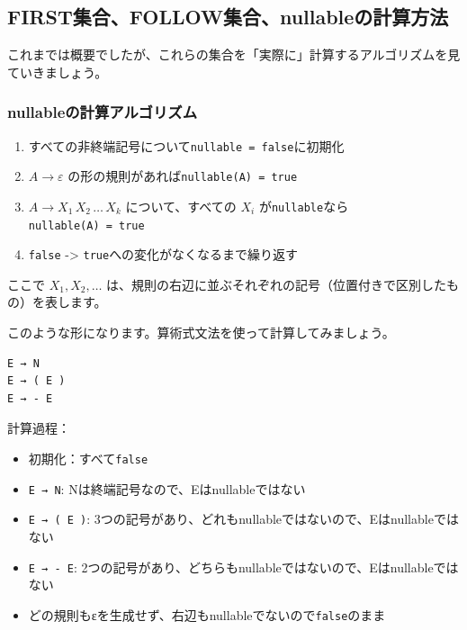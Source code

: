 \hypertarget{chapter5-firstux96c6ux5408followux96c6ux5408nullableux306eux8a08ux7b97ux65b9ux6cd5}{%
\subsection{FIRST集合、FOLLOW集合、nullableの計算方法}\label{chapter5-firstux96c6ux5408followux96c6ux5408nullableux306eux8a08ux7b97ux65b9ux6cd5}}

これまでは概要でしたが、これらの集合を「実際に」計算するアルゴリズムを見ていきましょう。

\hypertarget{chapter5-nullableux306eux8a08ux7b97ux30a2ux30ebux30b4ux30eaux30baux30e0}{%
\subsubsection{nullableの計算アルゴリズム}\label{chapter5-nullableux306eux8a08ux7b97ux30a2ux30ebux30b4ux30eaux30baux30e0}}

\begin{enumerate}
\def\labelenumi{\arabic{enumi}.}
\tightlist
\item
  すべての非終端記号について\texttt{nullable\ =\ false}に初期化
\item
  \(A \to \varepsilon\) の形の規則があれば\texttt{nullable(A)\ =\ true}
\item
  \(A \to X_1\,X_2\,\ldots\,X_k\) について、すべての \(X_i\)
  が\texttt{nullable}なら\texttt{nullable(A)\ =\ true}
\item
  \texttt{false} -\textgreater{}
  \texttt{true}への変化がなくなるまで繰り返す
\end{enumerate}

ここで \(X_1, X_2, \ldots\)
は、規則の右辺に並ぶそれぞれの記号（位置付きで区別したもの）を表します。

このような形になります。算術式文法を使って計算してみましょう。

\begin{verbatim}
E → N
E → ( E )
E → - E
\end{verbatim}

計算過程：

\begin{itemize}
\tightlist
\item
  初期化：すべて\texttt{false}
\item
  \texttt{E\ →\ N}: Nは終端記号なので、Eはnullableではない
\item
  \texttt{E\ →\ (\ E\ )}:
  3つの記号があり、どれもnullableではないので、Eはnullableではない
\item
  \texttt{E\ →\ -\ E}:
  2つの記号があり、どちらもnullableではないので、Eはnullableではない
\item
  どの規則もεを生成せず、右辺もnullableでないので\texttt{false}のまま
\end{itemize}

